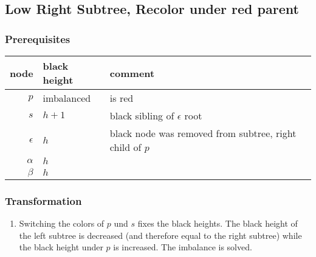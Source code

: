 \documentclass[a4paper,10pt,twoside]{article}
\begin{document}
\newpage
\subsection{Low Right Subtree, Recolor under red parent}

\subsubsection{Prerequisites}

\begin{center}
\begin{tabular}{|r||l|l|}
\hline
node		&	black height	&	comment	\\
\hline
\hline
$p$		&	imbalanced	&	is red	\\\hline
$s$		&	$h+1$	&	black sibling of $\epsilon$ root	\\\hline
$\epsilon$	&	$h$	&	black node was removed from subtree, right child of $p$	\\\hline
$\alpha$	&	$h$	&		\\\hline
$\beta$		&	$h$	&		\\\hline
\end{tabular}
\end{center}

\begin{center}
\end{center}

\subsubsection{Transformation}

\begin{enumerate}

\item Switching the colors of $p$ und $s$ fixes the black heights. The black
height of the left subtree is decreased (and therefore equal to the right
subtree) while the black height under $p$ is increased. The imbalance is
solved.

\begin{center}
\end{center}


\end{enumerate}
\end{document}
